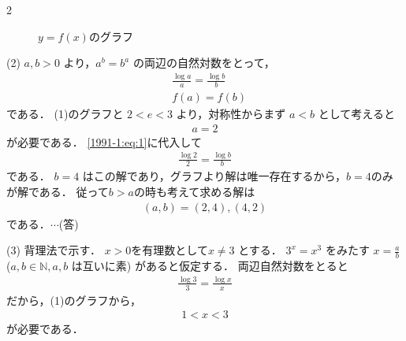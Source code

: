 \documentclass[../../../../main.tex]{subfiles}
\begin{document}
\begin{multicols}{2}
\begin{figure}[H]
        \caption{$y=f(x)$のグラフ}
        \label{1991-1:fig:1}
    \end{figure}

    \vspace{10pt}

    (2)
    $a, b > 0$ より，$a^b = b^a$ の両辺の自然対数をとって，
    \begin{align}
         & \frac{\log a}{a} = \frac{\log b}{b} \\
         & f(a) = f(b) \label{1991-1:eq:1}
    \end{align}
    である．
    (1)のグラフと $2 < e < 3$ より，対称性からまず $a < b$ として考えると
    \begin{align*}
        a = 2
    \end{align*}
    が必要である．
    \cref{1991-1:eq:1}に代入して
    \begin{align*}
        \frac{\log 2}{2} = \frac{\log b}{b}
    \end{align*}
    である．
    $b=4$ はこの解であり，グラフより解は唯一存在するから，$b=4$のみが解である．
    従って$b>a$の時も考えて求める解は
    \begin{align}
        (a,b) = (2,4), (4,2)\label{1991-1:eq:2}
    \end{align}
    である．$\cdots$(答)
    \vspace{10pt}

    (3)
    背理法で示す．
    $x>0$を有理数として$x \neq 3$ とする．
    $3^x = x^3$ をみたす $x = \frac{a}{b}$ ($a,b \in \mathbb{N}, a,b$ は互いに素) があると仮定する．
    両辺自然対数をとると
    \begin{align*}
        \frac{\log 3}{3} = \frac{\log x}{x}
    \end{align*}
    だから，(1)のグラフから，
    \begin{align}
        1 < x < 3 \label{1991-1:eq:3}
    \end{align}
    が必要である．


\end{multicols}
\end{document}
